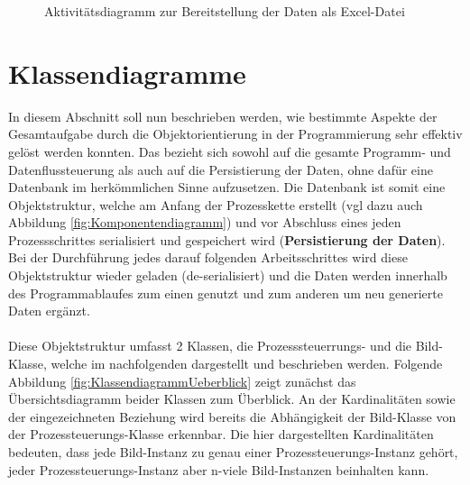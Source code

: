 \documentclass[
fontsize=10pt, 
listof = totoc,
parskip = half	
]{report}
\begin{document}
\begin{figure}[H]
	\centering
	\caption{Aktivitätsdiagramm zur Bereitstellung der Daten als Excel-Datei}
	\label{fig:FlowDatenbereitstellung}
\end{figure}

\section{Klassendiagramme}
\label{sec:Klassendiagramme}

In diesem Abschnitt soll nun beschrieben werden, wie bestimmte Aspekte der Gesamtaufgabe durch die Objektorientierung in der Programmierung sehr effektiv gelöst werden konnten. Das bezieht sich sowohl auf die gesamte Programm- und Datenflussteuerung als auch auf die Persistierung der Daten, ohne dafür eine Datenbank im herkömmlichen Sinne aufzusetzen. Die Datenbank ist somit eine Objektstruktur, welche am Anfang der Prozesskette erstellt (vgl dazu auch Abbildung \ref{fig:Komponentendiagramm}) und vor Abschluss eines jeden Prozessschrittes serialisiert und gespeichert wird (\textbf{Persistierung der Daten}). Bei der Durchführung jedes darauf folgenden Arbeitsschrittes  wird diese Objektstruktur wieder geladen (de-serialisiert) und die Daten werden innerhalb des Programmablaufes zum einen genutzt und zum anderen um neu generierte Daten ergänzt.
\\\\
\noindent Diese Objektstruktur umfasst 2 Klassen, die Prozesssteuerrungs- und die Bild-Klasse, welche im nachfolgenden dargestellt und beschrieben werden. Folgende Abbildung \ref{fig:KlassendiagrammUeberblick}  zeigt zunächst das Übersichtsdiagramm beider Klassen zum Überblick. An der Kardinalitäten sowie der eingezeichneten Beziehung wird bereits die Abhängigkeit der Bild-Klasse von der Prozessteuerungs-Klasse erkennbar. Die hier dargestellten Kardinalitäten bedeuten, dass jede Bild-Instanz zu genau einer Prozessteuerungs-Instanz gehört, jeder Prozessteuerungs-Instanz aber n-viele Bild-Instanzen beinhalten kann.
\end{document}
